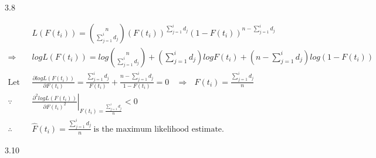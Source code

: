\documentclass[paper=a4, fontsize=12pt]{scrartcl} %
\numberwithin{equation}{section} %
\numberwithin{figure}{section} %
\numberwithin{table}{section} %
\begin{document}
3.8

\begin{align*}
				& 	L\left(F(t_i)\right) =  {n \choose \sum_{j = 1}^i d_j} \left(F(t_i)\right)^{\sum_{j = 1}^i d_j}\left(1-F(t_i)\right)^{n-\sum_{j = 1}^i d_j} \\
	\Rightarrow\ \ \ 	&	logL\left(F(t_i)\right) =  log{n \choose \sum_{j = 1}^i d_j}  + \left( \sum_{j = 1}^i d_j \right) logF(t_i) +  \left( n - \sum_{j = 1}^i d_j \right) log\left(1- F(t_i) \right)\\
	\text{Let}\ \ \ 	& \frac{\partial logL\left(F(t_i)\right)}{ \partial F(t_i)} = \frac{\sum_{j = 1}^i d_j }{F(t_i)} + \frac{n-\sum_{j = 1}^i d_j }{1-F(t_i)} = 0\ \ \ \ 
	\Rightarrow\ \ \ 		F(t_i) = \frac{\sum_{j = 1}^i d_j }{n}\\
	\because\ \ \ 	&	\left. \frac{\partial^2 logL\left(F(t_i)\right)}{ \partial F(t_i)^2} \right |_{F(t_i) = \frac{\sum_{j = 1}^i d_j }{n}} < 0 \\
	\therefore\ \ \	&	\hat{F}(t_i) = \frac{\sum_{j = 1}^i d_j }{n} \ \text{is the maximum likelihood estimate.}
\end{align*}

\newpage
3.10
\end{document}
